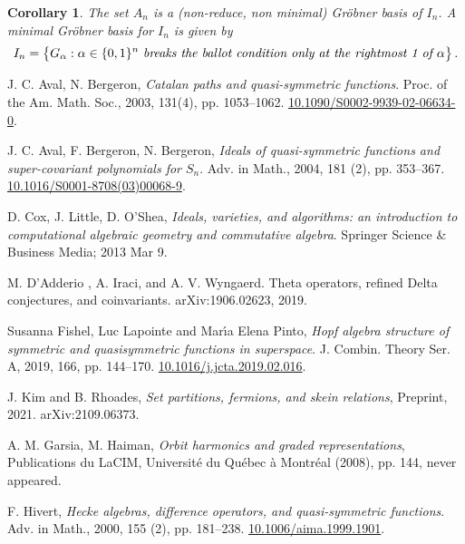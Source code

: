 \documentclass[11pt]{amsart}
\newtheorem{cor}[theorem]{Corollary}
\theoremstyle{definition}
\numberwithin{equation}{section}
\begin{document}
\begin{cor} The set $A_n$ is a (non-reduce, non minimal) Gr\"obner basis of $I_n$. A minimal Gr\"obner basis for $I_n$ is given by
$$ I_n =\big\{ G_\alpha : \alpha \in \{0,1\}^n \text{ \it breaks the ballot condition only
at the rightmost  1 of }  \alpha\big\}\,.
$$
\end{cor}


\vskip 1in

\begin{thebibliography}{999}

 J. C. Aval, N. Bergeron,
\textit{Catalan paths and quasi-symmetric functions}.
Proc. of the Am. Math. Soc., 2003, 131(4), pp. 1053--1062.
\href{https://doi.org/10.1090/S0002-9939-02-06634-0}{10.1090/S0002-9939-02-06634-0}.

 J. C. Aval, F. Bergeron, N. Bergeron,
\textit{Ideals of quasi-symmetric functions and super-covariant polynomials for $S_n$}.
Adv. in Math., 2004, 181 (2), pp. 353--367.
\href{https://doi.org/10.1016/S0001-8708(03)00068-9}{10.1016/S0001-8708(03)00068-9}.

 D. Cox, J. Little, D. O'Shea,
\textit{Ideals, varieties, and algorithms: an introduction to computational
algebraic geometry and commutative algebra}.
Springer Science \& Business Media; 2013 Mar 9.

 M. D'Adderio , A. Iraci, and A. V. Wyngaerd.
Theta operators, refined Delta conjectures, and
coinvariants. arXiv:1906.02623, 2019.

Susanna Fishel, Luc Lapointe and Mar\'{\i}a Elena Pinto,
\textit{Hopf algebra structure of symmetric and quasisymmetric
              functions in superspace}.
 {J. Combin. Theory Ser. A}, 2019, 166, pp.  {144--170}.
\href{https://doi-org/10.1016/j.jcta.2019.02.016}{10.1016/j.jcta.2019.02.016}.

 J. Kim and B. Rhoades,
\textit{Set partitions, fermions, and skein relations}, Preprint, 2021. arXiv:2109.06373.

 A. M. Garsia, M. Haiman,
\textit{Orbit harmonics and graded representations},
Publications du LaCIM, Universit\'e du Qu\'ebec \`a Montr\'eal (2008), pp. 144,
never appeared.

 F. Hivert,
\textit{Hecke algebras, difference operators, and quasi-symmetric
              functions}.
Adv. in Math., 2000, 155 (2), pp. 181--238.
\href{https://doi-org/10.1006/aima.1999.1901}{10.1006/aima.1999.1901}.


\end{thebibliography}
\end{document}

